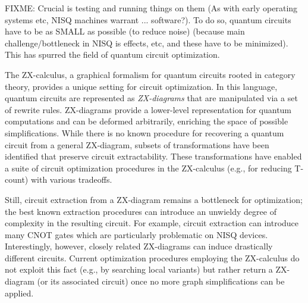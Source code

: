 FIXME: Crucial is testing and running things on them (As with early operating systems etc, NISQ machines warrant ... software?). To do so, quantum circuits have to be as SMALL as possible (to reduce noise) (because main challenge/bottleneck in NISQ is effects, etc, and these have to be minimized). This has spurred the field of quantum circuit optimization.
\fi


The ZX-calculus, a graphical formalism for quantum circuits rooted in category theory, provides a unique setting for circuit optimization.
In this language, quantum circuits are represented as \emph{ZX-diagrams} that are manipulated via a set of rewrite rules.
ZX-diagrams provide a lower-level representation for quantum computations and can be deformed arbitrarily, enriching the space of possible simplifications.
While there is no known procedure for recovering a quantum circuit from a general ZX-diagram, subsets of transformations have been identified that preserve circuit extractability.
These transformations have enabled a suite of circuit optimization procedures in the ZX-calculus (e.g., for reducing T-count) with various tradeoffs.

Still, circuit extraction from a ZX-diagram remains a bottleneck for optimization;
the best known extraction procedures can introduce an unwieldy degree of complexity in the resulting circuit.
For example, circuit extraction can introduce many CNOT gates which are particularly problematic on NISQ devices.
Interestingly, however, closely related ZX-diagrams can induce drastically different circuits.
Current optimization procedures employing the ZX-calculus do not exploit this fact (e.g., by searching local variants) but rather return a ZX-diagram (or its associated circuit) once no more graph simplifications can be applied.

